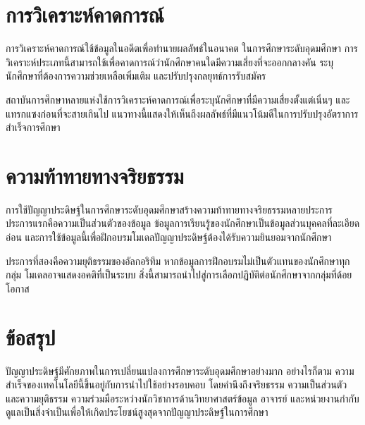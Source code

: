 \documentclass[
    language=thai,
    doctype=article,
]{../../omnilatex}
\begin{document}
\section{การวิเคราะห์คาดการณ์}
การวิเคราะห์คาดการณ์ใช้ข้อมูลในอดีตเพื่อทำนายผลลัพธ์ในอนาคต ในการศึกษาระดับอุดมศึกษา การวิเคราะห์ประเภทนี้สามารถใช้เพื่อคาดการณ์ว่านักศึกษาคนใดมีความเสี่ยงที่จะออกกลางคัน ระบุนักศึกษาที่ต้องการความช่วยเหลือเพิ่มเติม และปรับปรุงกลยุทธ์การรับสมัคร

สถาบันการศึกษาหลายแห่งใช้การวิเคราะห์คาดการณ์เพื่อระบุนักศึกษาที่มีความเสี่ยงตั้งแต่เนิ่นๆ และแทรกแซงก่อนที่จะสายเกินไป แนวทางนี้แสดงให้เห็นถึงผลลัพธ์ที่มีแนวโน้มดีในการปรับปรุงอัตราการสำเร็จการศึกษา

\section{ความท้าทายทางจริยธรรม}
การใช้ปัญญาประดิษฐ์ในการศึกษาระดับอุดมศึกษาสร้างความท้าทายทางจริยธรรมหลายประการ ประการแรกคือความเป็นส่วนตัวของข้อมูล ข้อมูลการเรียนรู้ของนักศึกษาเป็นข้อมูลส่วนบุคคลที่ละเอียดอ่อน และการใช้ข้อมูลนี้เพื่อฝึกอบรมโมเดลปัญญาประดิษฐ์ต้องได้รับความยินยอมจากนักศึกษา

ประการที่สองคือความยุติธรรมของอัลกอริทึม หากข้อมูลการฝึกอบรมไม่เป็นตัวแทนของนักศึกษาทุกกลุ่ม โมเดลอาจแสดงอคติที่เป็นระบบ สิ่งนี้สามารถนำไปสู่การเลือกปฏิบัติต่อนักศึกษาจากกลุ่มที่ด้อยโอกาส

\section{ข้อสรุป}
ปัญญาประดิษฐ์มีศักยภาพในการเปลี่ยนแปลงการศึกษาระดับอุดมศึกษาอย่างมาก อย่างไรก็ตาม ความสำเร็จของเทคโนโลยีนี้ขึ้นอยู่กับการนำไปใช้อย่างรอบคอบ โดยคำนึงถึงจริยธรรม ความเป็นส่วนตัว และความยุติธรรม ความร่วมมือระหว่างนักวิชาการด้านวิทยาศาสตร์ข้อมูล อาจารย์ และหน่วยงานกำกับดูแลเป็นสิ่งจำเป็นเพื่อให้เกิดประโยชน์สูงสุดจากปัญญาประดิษฐ์ในการศึกษา
\end{document}
